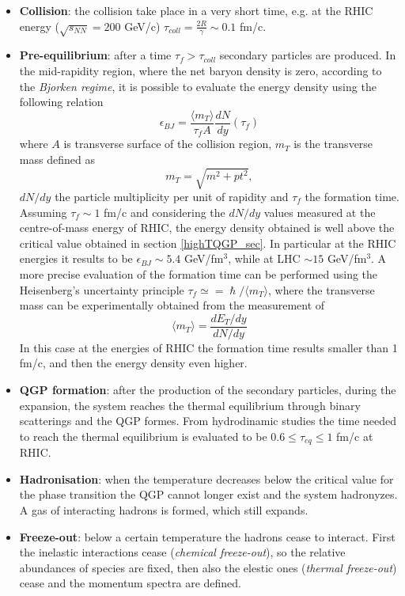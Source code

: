 \documentclass[b5paper,10pt,twoside,oldstyle,classica]{toptesi}
\begin{document}
\begin{itemize}
 \item \textbf{Collision}: the collision take place in a very short time, e.g. at the RHIC energy ($\sqrt{s_{NN}}=200$ GeV/c) $\tau_{coll} = \frac{2R}{\gamma} \sim 0.1$ fm/c.
 \item \textbf{Pre-equilibrium}: after a time $\tau_f > \tau_{coll}$ secondary particles are produced. In the mid-rapidity region, where the net baryon density is zero, according to the \textit{Bjorken regime}, it is possible to evaluate the energy density using the following relation
 \begin{equation}
 \label{bjorken_e}
 \epsilon_{BJ} = \frac{\langle m_T \rangle}{\tau_f A} \frac{dN}{dy}(\tau_f)
 \end{equation}
 where $A$ is transverse surface of the collision region, $m_T$ is the transverse mass defined as 
 \begin{equation}
  m_T = \sqrt{m^2+pt^2},
 \end{equation}
$dN/dy$ the particle multiplicity per unit of rapidity and $\tau_f$ the formation time. Assuming $\tau_f \sim 1$ fm/c and considering the $dN/dy$ values measured at the centre-of-mass energy of RHIC, the energy density obtained is well above the critical value obtained in section \ref{highTQGP_sec}. In particular at the RHIC energies it results to be $\epsilon_{BJ} \sim 5.4$ GeV/fm$^3$, while at LHC $\sim 15$ GeV/fm$^3$.
A more precise evaluation of the formation time can be performed using the Heisenberg's uncertainty principle $\tau_f \simeq = \hslash/\langle m_T \rangle$, where the transverse mass can be experimentally obtained from the measurement of 
 \begin{equation}
  \langle m_T \rangle = \frac{dE_T/dy}{dN/dy}
  \end{equation}
 In this case at the energies of RHIC the formation time results smaller than 1 fm/c, and then the energy density even higher. 
 \item \textbf{QGP formation}: after the production of the secondary particles, during the expansion, the system reaches the thermal equilibrium through binary scatterings and the QGP formes. From hydrodinamic studies the time needed to reach the thermal equilibrium is evaluated to be $0.6 \leq \tau_{eq} \leq 1$ fm/c at RHIC.     
 \item \textbf{Hadronisation}: when the temperature decreases below the critical value for the phase transition the QGP cannot longer exist and the system hadronyzes. A gas of interacting hadrons is formed, which still expands.
 \item \textbf{Freeze-out}: below a certain temperature the hadrons cease to interact. First the inelastic interactions cease (\textit{chemical freeze-out}), so the relative abundances of species are fixed, then also the elestic ones (\textit{thermal freeze-out}) cease and the momentum spectra are defined.
\end{itemize}
\end{document}

